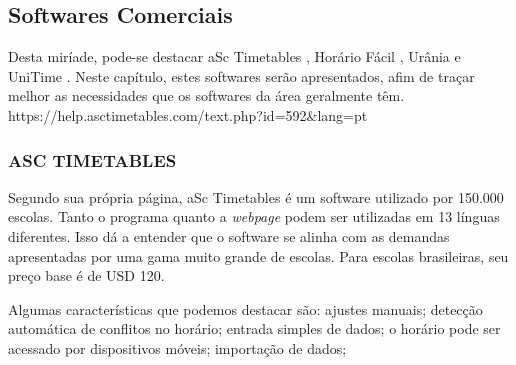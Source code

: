 \documentclass[12pt,a4paper]{article}
\begin{document}
		\subsection{Softwares Comerciais}

			\par Desta miríade, pode-se destacar aSc Timetables \cite{rel_asctimetables}, Horário Fácil \cite{rel_horariofacil}, Urânia \cite{rel_urania} e UniTime \cite{rel_unitime}. Neste capítulo, estes softwares serão apresentados, afim de traçar melhor as necessidades que os softwares da área geralmente têm. https://help.asctimetables.com/text.php?id=592&lang=pt

			\subsubsection{ASC TIMETABLES}

				\par Segundo sua própria página, aSc Timetables é um software utilizado por 150.000 escolas. Tanto o programa quanto a \textit{webpage} podem ser utilizadas em 13 línguas diferentes. Isso dá a entender que o software se alinha com as demandas apresentadas por uma gama muito grande de escolas. Para escolas brasileiras, seu preço base é de USD 120.

				\par Algumas características que podemos destacar são: ajustes manuais; detecção automática de conflitos no horário; entrada simples de dados;  o horário pode ser acessado por dispositivos móveis; importação de dados;
\end{document}
